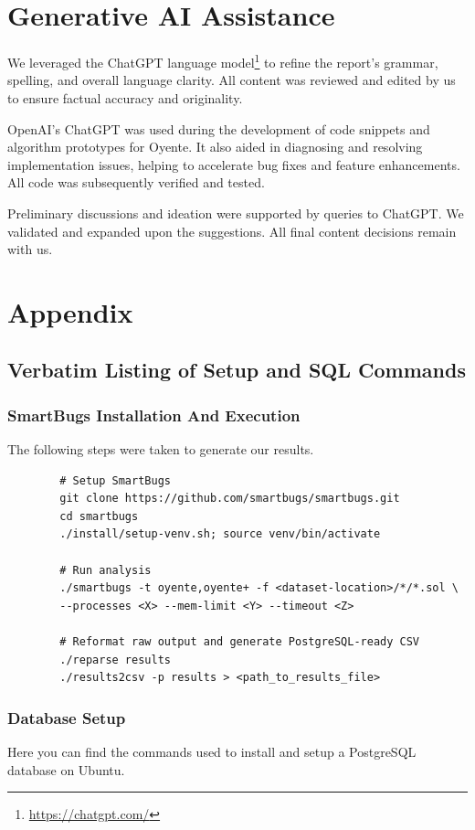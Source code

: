 \documentclass{article}
\newcommand\OY{Oyente}
\newcommand\OYp{\OY\raisebox{0.3ex}{\smaller +}}
\begin{document}
	\section*{Generative AI Assistance}
	We leveraged the ChatGPT language model\footnote{\url{https://chatgpt.com/}} to refine the report’s grammar, spelling, and overall language clarity. All content was reviewed and edited by us to ensure factual accuracy and originality.

	OpenAI’s ChatGPT was used during the development of code snippets and algorithm prototypes for \OYp. It also aided in diagnosing and resolving implementation issues, helping to accelerate bug fixes and feature enhancements. All code was subsequently verified and tested.

	Preliminary discussions and ideation were supported by queries to ChatGPT. We validated and expanded upon the suggestions. All final content decisions remain with us.

    \newpage
	\appendix
	\section*{Appendix}

	\subsection*{Verbatim Listing of Setup and SQL Commands}

	\subsubsection*{SmartBugs Installation And Execution}
	The following steps were taken to generate our results.

	\begin{verbatim}
		# Setup SmartBugs
		git clone https://github.com/smartbugs/smartbugs.git
		cd smartbugs
		./install/setup-venv.sh; source venv/bin/activate

		# Run analysis
		./smartbugs -t oyente,oyente+ -f <dataset-location>/*/*.sol \
		--processes <X> --mem-limit <Y> --timeout <Z>

		# Reformat raw output and generate PostgreSQL-ready CSV
		./reparse results
		./results2csv -p results > <path_to_results_file>
	\end{verbatim}

	\subsubsection*{Database Setup}
	Here you can find the commands used to install and setup a PostgreSQL database on Ubuntu.
\end{document}
